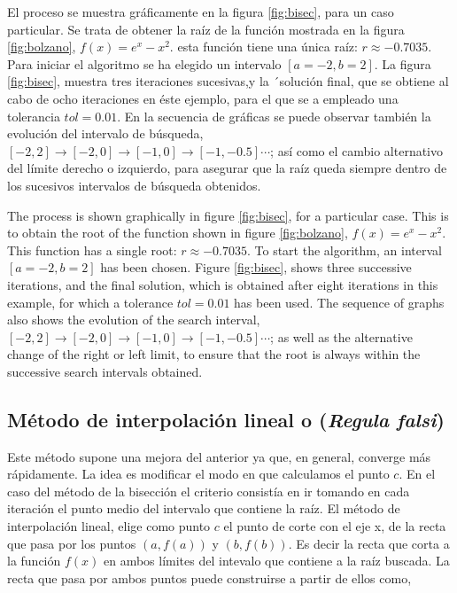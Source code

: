 \begin{paracol}{2}
El proceso se muestra gráficamente en la figura \ref{fig:bisec}, para un caso particular. Se trata de obtener la raíz de la función mostrada en la figura \ref{fig:bolzano}, $f(x)=e^x-x^2$. esta función tiene una única raíz: $r\approx -0.7035$. Para iniciar el algoritmo se ha elegido un intervalo $[a=-2,b=2]$. La figura \ref{fig:bisec}, muestra tres iteraciones sucesivas,y la ´solución final, que se obtiene al cabo de ocho iteraciones en éste ejemplo, para el que se a empleado una tolerancia $tol=0.01$. En la secuencia de gráficas se puede observar también la evolución del intervalo de búsqueda, $[-2, 2]\rightarrow [-2, 0] \rightarrow [-1, 0] \rightarrow [-1, -0.5] \cdots$; así como el cambio alternativo del límite derecho o izquierdo, para asegurar que la raíz queda siempre dentro de los sucesivos intervalos de búsqueda obtenidos. 

\switchcolumn

The process is shown graphically in figure \ref{fig:bisec}, for a particular case. This is to obtain the root of the function shown in figure \ref{fig:bolzano}, $f(x)=e^x-x^2$. This function has a single root: $r\approx -0.7035$. To start the algorithm, an interval $[a=-2,b=2]$ has been chosen. Figure \ref{fig:bisec}, shows three successive iterations, and the final solution, which is obtained after eight iterations in this example, for which a tolerance $tol=0.01$ has been used. The sequence of graphs also shows the evolution of the search interval, $[-2, 2]\rightarrow [-2, 0] \rightarrow [-1, 0] \rightarrow [-1, -0.5] \cdots$; as well as the alternative change of the right or left limit, to ensure that the root is always within the successive search intervals obtained. 



\switchcolumn


\subsection{Método de interpolación lineal o (\emph{Regula falsi})}
Este método supone una mejora del anterior ya que, en general,  converge más rápidamente. La idea es modificar el modo en que calculamos el punto $c$. En el caso del método de la bisección el criterio consistía en ir tomando en cada iteración el punto medio del intervalo que contiene la raíz. El método de interpolación lineal, elige como punto $c$ el punto de corte con el eje x, de la recta que pasa por los puntos $\left(a,f(a)\right)$ y $\left(b,f(b)\right)$. Es decir la recta que corta a la función $f(x)$ en ambos límites del intevalo que contiene a la raíz buscada. La recta que pasa por ambos puntos puede construirse a partir de ellos como,


\end{paracol}

